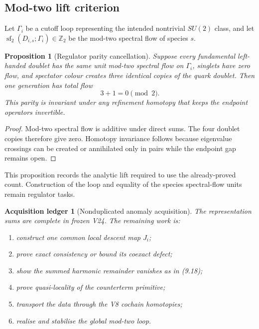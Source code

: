 \documentclass[11pt]{article}
\newtheorem{proposition}[theorem]{Proposition}
\newtheorem{ledger}[theorem]{Acquisition ledger}
\theoremstyle{remark}
\begin{document}
\subsection{Mod-two lift criterion}

Let \(\Gamma_i\) be a cutoff loop representing the intended nontrivial
\(SU(2)\) class, and let
\(\operatorname{sf}_2(D_{i,s};\Gamma_i)\in\mathbb Z_2\) be the
mod-two spectral flow of species \(s\).

\begin{proposition}[Regulator parity cancellation]
\label{prop:v12v9-parity}
Suppose every fundamental left-handed doublet has the same unit
mod-two spectral flow on \(\Gamma_i\), singlets have zero flow, and
spectator colour creates three identical copies of the quark
doublet.  Then one generation has total flow
\[
                              3+1=0\pmod2.                   \tag{9.20}
\]
This parity is invariant under any refinement homotopy that keeps the
endpoint operators invertible.
\end{proposition}

\begin{proof}
Mod-two spectral flow is additive under direct sums.  The four
doublet copies therefore give zero.  Homotopy invariance follows
because eigenvalue crossings can be created or annihilated only in
pairs while the endpoint gap remains open.
\end{proof}

This proposition records the analytic lift required to use the
already-proved count.  Construction of the loop and equality of the
species spectral-flow units remain regulator tasks.

\begin{ledger}[Nonduplicated anomaly acquisition]
\label{led:v12v9-data}
The representation sums are complete in frozen V24.  The remaining
work is:
\begin{enumerate}
\item construct one common local descent map \(J_i\);
\item prove exact consistency or bound its coexact defect;
\item show the summed harmonic remainder vanishes as in (9.18);
\item prove quasi-locality of the counterterm primitive;
\item transport the data through the V8 cochain homotopies;
\item realise and stabilise the global mod-two loop.
\end{enumerate}
\end{ledger}
\end{document}
